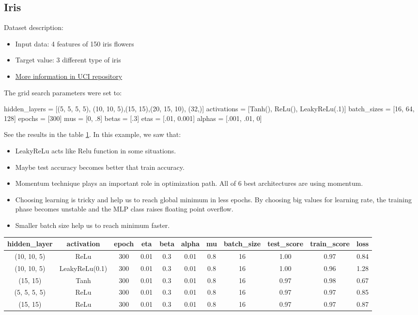 \documentclass[10pt]{SelfArx} %
\begin{document}
\subsection{Iris}
Dataset description:
\begin{itemize}
	\item Input data: 4 features of 150 iris flowers
	
	\item Target value: 3 different type of iris	
	
	\item \href{https://archive.ics.uci.edu/ml/datasets/Iris}{More information in UCI repository}
\end{itemize}
The grid search parameters were set to:
\begin{python}
hidden_layers = [(5, 5, 5, 5),
(10, 10, 5),(15, 15),(20, 15, 10),
       (32,)]
activations = [Tanh(), ReLu(),
                LeakyReLu(.1)]
batch_sizes = [16, 64, 128]
epochs = [300]
mus = [0, .8]
betas = [.3]
etas = [.01, 0.001]
alphas = [.001, .01, 0]
\end{python}
See the results in the table \ref{tiris}. In this example, we saw that:
\begin{itemize}
\item  LeakyReLu acts like Relu function in some situations.
\item  Maybe test accuracy becomes better that train accuracy.
\item  Momentum technique plays an important role in optimization path. All of 6 best architectures are using momentum.
\item  Choosing learning is tricky and help us to reach global minimum in less epochs. By choosing big values for learning rate, the training phase becomes unstable and the MLP class raises floating point overflow.
\item  Smaller batch size help us to reach minimum faster.
\end{itemize}
\begin{table}[hbt]
	\centering
  \begin{tabular*}{1\textwidth}{@{\extracolsep{\fill} }ccccccccccc@{}}
	\toprule
	hidden\_layer & activation & epoch & eta & beta & alpha & mu & batch\_size & test\_score & train\_score & loss \\ \midrule
	(10, 10, 5) & ReLu & 300 & 0.01 & 0.3 & 0.01 & 0.8 & 16 & 1.00 & 0.97 & 0.84 \\
	(10, 10, 5) & LeakyReLu(0.1) & 300 & 0.01 & 0.3 & 0.01 & 0.8 & 16 & 1.00 & 0.96 & 1.28 \\
	(15, 15) & Tanh & 300 & 0.01 & 0.3 & 0.01 & 0.8 & 16 & 0.97 & 0.98 & 0.67 \\
	(5, 5, 5, 5) & ReLu & 300 & 0.01 & 0.3 & 0.01 & 0.8 & 16 & 0.97 & 0.97 & 0.85 \\
	(15, 15) & ReLu & 300 & 0.01 & 0.3 & 0.01 & 0.8 & 16 & 0.97 & 0.97 & 0.87 \\ \bottomrule
\end{tabular*}
	\label{tiris}
\end{table}
\end{document}
